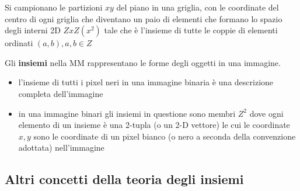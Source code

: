Si campionano le partizioni $xy$ del piano in una griglia, con le coordinate del centro di ogni griglia che diventano un paio di elementi che formano lo spazio degli interni 2D $ZxZ(x^2)$ tale che è l'insieme di tutte le coppie di elementi ordinati $(a, b), a,b \in Z$

Gli \textbf{insiemi} nella MM rappresentano le forme degli oggetti in una immagine.
\begin{itemize}
	\item l'insieme di tutti i pixel neri in una immagine binaria è una descrizione completa dell'immagine
	
	\item in una immagine binari gli insiemi in questione sono membri $Z^2$ dove ogni elemento di un insieme è una 2-tupla (o un 2-D vettore) le cui le coordinate $x, y$ sono le coordinate di un pixel bianco (o nero a seconda della convenzione adottata) nell'immagine
\end{itemize}

\subsection{Altri concetti della teoria degli insiemi}

